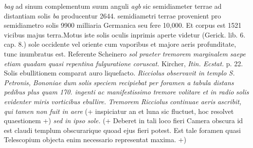 \textit{bag} ad sinum complementum suum anguli \textit{agb} sic semidiameter terrae\protect{} ad distantiam solis\protect{} \textit{ba} producentur 2644.  semidiametri terrae\protect{} provenient pro semidiametro solis 9900 milliaria Germanica seu fere  10,000. Et corpus est 1521 vicibus majus terra\protect{}.\pend \pstart Motus iste solis\protect{} oculis inprimis aperte videtur  (Gerick. lib. 6. cap. 8.) sole\protect{} occidente  vel oriente cum vaporibus et majore  aeris profunditate, tunc inumbratus est.  Referente Scheinero\protect{} \textit{sol}\protect{}\textit{ praeter  tremorem marginalem saepe etiam quadam quasi repentina fulguratione coruscat.} Kircher\protect{}, \textit{Itin. Ecstat.} p. 22. Solis\protect{} ebullitionem  comparat auro\protect{} liquefacto. \textit{Ricciolus}\protect{}\textit{ observavit in templo S. Petronis, }\textit{Bononiae}\protect{}\textit{  dum }\textit{solis}\protect{}\textit{ speciem recipiebat per  foramen a tabula distans pedibus  plus quam 170. ingenti ac manifestissimo tremore volitare et in  radio }\textit{solis}\protect{}\textit{ evidenter miris vorticibus  ebullire.}\textit{ Tremorem }\textit{Ricciolus}\protect{}\textit{ continuae aeris }\textit{ ascribit, qui  tamen non fuit in aere} (+ inspiciatur an et luna\protect{} sic fluctuet, hoc  resolvet quaestionem +) \textit{sed in ipso }\textit{sole}\protect{}\textit{.} (+ Deberet in tali loco fieri Camera obscura\protect{} id est claudi templum  obscurarique quoad ejus fieri potest. Est  tale foramen quasi Telescopium\protect{} objecta  enim necessario representat maxima. +) 
 \pend